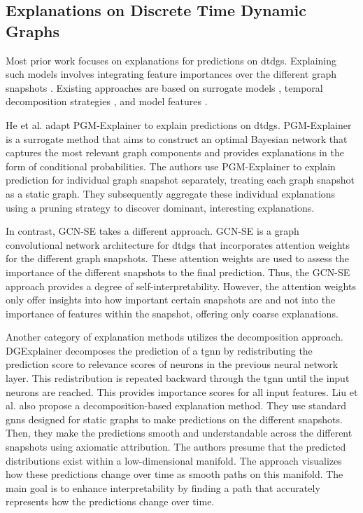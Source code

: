 \subsection{Explanations on Discrete Time Dynamic Graphs}
\label{s_relatedWork_DTDG}

Most prior work focuses on explanations for predictions on \glspl{dtdg}. Explaining such models involves integrating feature importances over the different graph snapshots \cite{he_explainer_2022}. Existing approaches are based on surrogate models \cite{he_explainer_2022}, temporal decomposition strategies \cite{xie_explaining_2022, liu_differential_2023}, and model features \cite{fan_gcn-se_2021}.

He et al. \cite{he_explainer_2022} adapt PGM-Explainer \cite{vu_pgm-explainer_2020} to explain predictions on \glspl{dtdg}. PGM-Explainer is a surrogate method that aims to construct an optimal Bayesian network that captures the most relevant graph components and provides explanations in the form of conditional probabilities. The authors use PGM-Explainer to explain prediction for individual graph snapshot separately, treating each graph snapshot as a static graph. They subsequently aggregate these individual explanations using a pruning strategy to discover dominant, interesting explanations.

In contrast, GCN-SE \cite{fan_gcn-se_2021} takes a different approach. GCN-SE is a graph convolutional network architecture for \glspl{dtdg} that incorporates attention weights for the different graph snapshots. These attention weights are used to assess the importance of the different snapshots to the final prediction. Thus, the GCN-SE approach provides a degree of self-interpretability. However, the attention weights only offer insights into how important certain snapshots are and not into the importance of features within the snapshot, offering only coarse explanations.

Another category of explanation methods utilizes the decomposition approach. DGExplainer \cite{xie_explaining_2022} decomposes the prediction of a \gls{tgnn} by redistributing the prediction score to relevance scores of neurons in the previous neural network layer. This redistribution is repeated backward through the \gls{tgnn} until the input neurons are reached. This provides importance scores for all input features. Liu et al. \cite{liu_differential_2023} also propose a decomposition-based explanation method. They use standard \glspl{gnn} designed for static graphs to make predictions on the different snapshots. Then, they make the predictions smooth and understandable across the different snapshots using axiomatic attribution. The authors presume that the predicted distributions exist within a low-dimensional manifold. The approach visualizes how these predictions change over time as smooth paths on this manifold. The main goal is to enhance interpretability by finding a path that accurately represents how the predictions change over time.


